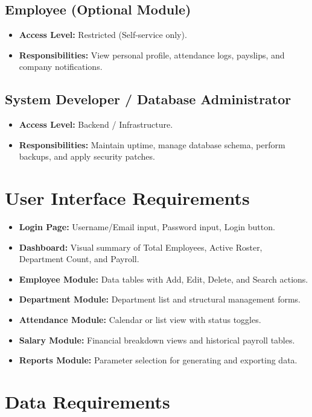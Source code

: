 \documentclass[12pt,a4paper]{report}
\begin{document}
\subsection{Employee (Optional Module)}
\begin{itemize}
  \item \textbf{Access Level:} Restricted (Self-service only).
  \item \textbf{Responsibilities:} View personal profile, attendance logs, payslips, and company notifications.
\end{itemize}

\subsection{System Developer / Database Administrator}
\begin{itemize}
  \item \textbf{Access Level:} Backend / Infrastructure.
  \item \textbf{Responsibilities:} Maintain uptime, manage database schema, perform backups, and apply security patches.
\end{itemize}

\section{User Interface Requirements}
\begin{itemize}
  \item \textbf{Login Page:} Username/Email input, Password input, Login button.
  \item \textbf{Dashboard:} Visual summary of Total Employees, Active Roster, Department Count, and Payroll.
  \item \textbf{Employee Module:} Data tables with Add, Edit, Delete, and Search actions.
  \item \textbf{Department Module:} Department list and structural management forms.
  \item \textbf{Attendance Module:} Calendar or list view with status toggles.
  \item \textbf{Salary Module:} Financial breakdown views and historical payroll tables.
  \item \textbf{Reports Module:} Parameter selection for generating and exporting data.
\end{itemize}

\section{Data Requirements}
\end{document}
